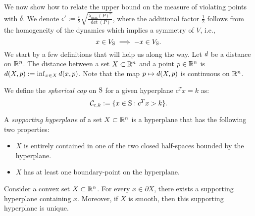 We now show how to relate the upper bound on the measure of violating points with $\delta$. We denote $\epsilon':=\frac{\epsilon}{2} \sqrt{\frac{\lambda_{\max}(P)^n}{\det(P)}}$, where the additional factor $\frac{1}{2}$ follows from the homogeneity of the dynamics which implies a symmetry of $V$, i.e., \begin{equation*}x \in V_{\text{S}} \implies -x \in V_{\text{S}}.\end{equation*}
We start by a few definitions that will help us along the way. Let $d$ be a distance on $\mathbb{R}^n$. The distance between a set $X \subset \mathbb{R}^n$ and a point $p \in \mathbb{R}^n$ is $d(X, p):=\inf_{x \in X}d(x,p)$. Note that the map $p \mapsto d(X,p)$ is continuous on $\mathbb{R}^n$.

\begin{definition}%
We define the \emph{spherical cap} on $\text{S}$ for a given hyperplane $c^Tx = k$ as:
\begin{equation*}\mathcal{C}_{c,k} := \{x \in \text{S} : c^Tx >k\}.\end{equation*}
\end{definition}

\begin{definition}A \emph{supporting hyperplane} of a set $X \subset \mathbb{R}^n$ is a hyperplane that has the following two properties:
\begin{itemize}
\item $X$ is entirely contained in one of the two closed half-spaces bounded by the hyperplane.
\item $X$ has at least one boundary-point on the hyperplane.
\end{itemize}
\end{definition}

\begin{remark}\label{suppHyperplaneRemark}\cite{boyd} Consider a convex set $X \subset \mathbb{R}^n$. For every $x \in \partial X$, there exists a supporting hyperplane containing $x$. Moreover, if $X$ is smooth, then this supporting hyperplane is unique.
\end{remark}


